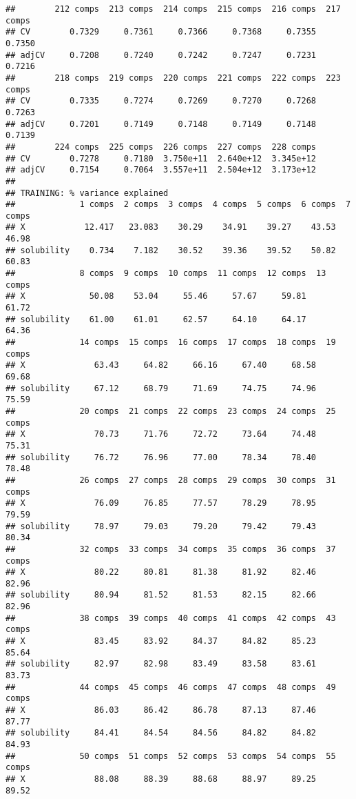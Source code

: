 \documentclass[]{article}
\begin{document}
\begin{verbatim}
##        212 comps  213 comps  214 comps  215 comps  216 comps  217 comps
## CV        0.7329     0.7361     0.7366     0.7368     0.7355     0.7350
## adjCV     0.7208     0.7240     0.7242     0.7247     0.7231     0.7216
##        218 comps  219 comps  220 comps  221 comps  222 comps  223 comps
## CV        0.7335     0.7274     0.7269     0.7270     0.7268     0.7263
## adjCV     0.7201     0.7149     0.7148     0.7149     0.7148     0.7139
##        224 comps  225 comps  226 comps  227 comps  228 comps
## CV        0.7278     0.7180  3.750e+11  2.640e+12  3.345e+12
## adjCV     0.7154     0.7064  3.557e+11  2.504e+12  3.173e+12
## 
## TRAINING: % variance explained
##             1 comps  2 comps  3 comps  4 comps  5 comps  6 comps  7 comps
## X            12.417   23.083    30.29    34.91    39.27    43.53    46.98
## solubility    0.734    7.182    30.52    39.36    39.52    50.82    60.83
##             8 comps  9 comps  10 comps  11 comps  12 comps  13 comps
## X             50.08    53.04     55.46     57.67     59.81     61.72
## solubility    61.00    61.01     62.57     64.10     64.17     64.36
##             14 comps  15 comps  16 comps  17 comps  18 comps  19 comps
## X              63.43     64.82     66.16     67.40     68.58     69.68
## solubility     67.12     68.79     71.69     74.75     74.96     75.59
##             20 comps  21 comps  22 comps  23 comps  24 comps  25 comps
## X              70.73     71.76     72.72     73.64     74.48     75.31
## solubility     76.72     76.96     77.00     78.34     78.40     78.48
##             26 comps  27 comps  28 comps  29 comps  30 comps  31 comps
## X              76.09     76.85     77.57     78.29     78.95     79.59
## solubility     78.97     79.03     79.20     79.42     79.43     80.34
##             32 comps  33 comps  34 comps  35 comps  36 comps  37 comps
## X              80.22     80.81     81.38     81.92     82.46     82.96
## solubility     80.94     81.52     81.53     82.15     82.66     82.96
##             38 comps  39 comps  40 comps  41 comps  42 comps  43 comps
## X              83.45     83.92     84.37     84.82     85.23     85.64
## solubility     82.97     82.98     83.49     83.58     83.61     83.73
##             44 comps  45 comps  46 comps  47 comps  48 comps  49 comps
## X              86.03     86.42     86.78     87.13     87.46     87.77
## solubility     84.41     84.54     84.56     84.82     84.82     84.93
##             50 comps  51 comps  52 comps  53 comps  54 comps  55 comps
## X              88.08     88.39     88.68     88.97     89.25     89.52

\end{verbatim}
\end{document}
